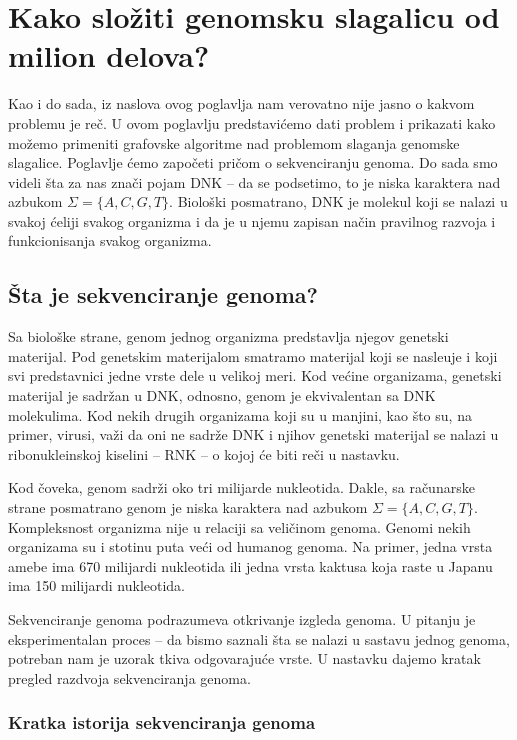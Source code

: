 \chapter{Kako složiti genomsku slagalicu od milion delova?}
\setbookcodestyle

Kao i do sada, iz naslova ovog poglavlja nam verovatno nije jasno o kakvom problemu je re\v c. U ovom poglavlju predstavi\'cemo dati problem i prikazati kako mo\v zemo primeniti grafovske algoritme nad problemom slaganja genomske slagalice. Poglavlje \'cemo zapo\v ceti pri\v com o sekvenciranju genoma. Do sada smo videli \v sta za nas zna\v ci pojam DNK -- da se podsetimo, to je niska karaktera nad azbukom $\Sigma = \{A, C, G, T\}$. Biolo\v ski posmatrano, DNK je molekul koji se nalazi u svakoj \'celiji svakog organizma i da je u njemu zapisan na\v cin pravilnog razvoja i funkcionisanja svakog organizma. 

\section{Šta je sekvenciranje genoma?}

Sa biološke strane, genom jednog organizma predstavlja njegov genetski materijal. Pod genetskim materijalom smatramo materijal koji se nasle\dj uje i koji svi predstavnici jedne vrste dele u velikoj meri. Kod većine organizama, genetski materijal je sadržan u DNK, odnosno, genom je ekvivalentan sa DNK molekulima. Kod nekih drugih organizama koji su u manjini, kao \v sto su, na primer, virusi, va\v zi da oni ne sadr\v ze DNK i njihov genetski materijal se nalazi u ribonukleinskoj kiselini -- RNK -- o kojoj \'ce biti re\v ci u nastavku. 

Kod čoveka, genom sadrži oko tri milijarde nukleotida. Dakle, sa računarske strane posmatrano genom je niska karaktera nad azbukom $\Sigma = \{A, C, G, T\}$. Kompleksnost organizma nije u relaciji sa veli\v cinom genoma. Genomi nekih organizama su i stotinu puta veći od humanog genoma. Na primer, jedna vrsta amebe ima 670 milijardi nukleotida ili jedna vrsta kaktusa koja raste u Japanu ima 150 milijardi nukleotida.

Sekvenciranje genoma podrazumeva otkrivanje izgleda genoma. U pitanju je eksperimentalan proces -- da bismo saznali \v sta se nalazi u sastavu jednog genoma, potreban nam je uzorak tkiva odgovaraju\'ce vrste. U nastavku dajemo kratak pregled razdvoja sekvenciranja genoma.

\subsection{Kratka istorija sekvenciranja genoma}

